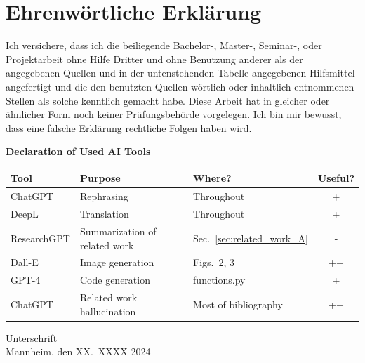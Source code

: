 \documentclass[a4paper,oneside,bibliography=totoc]{scrbook}
\begin{document}
\backmatter
\chapter{Ehrenwörtliche Erklärung}

Ich versichere, dass ich die beiliegende Bachelor-, Master-, Seminar-, oder
Projektarbeit ohne Hilfe Dritter und ohne Benutzung anderer als der angegebenen
Quellen und in der untenstehenden Tabelle angegebenen Hilfsmittel angefertigt
und die den benutzten Quellen wörtlich oder inhaltlich entnommenen Stellen als
solche kenntlich gemacht habe. Diese Arbeit hat in gleicher oder ähnlicher Form
noch keiner Prüfungsbehörde vorgelegen. Ich bin mir bewusst, dass eine falsche
Erklärung rechtliche Folgen haben wird.

\begin{center}
  \textbf{Declaration of Used AI Tools} \\[.3em]
  \begin{tabularx}{\textwidth}{lXlc}
    \toprule
    Tool & Purpose & Where? & Useful? \\
    \midrule
    ChatGPT & Rephrasing & Throughout & + \\
    DeepL & Translation & Throughout & + \\
    ResearchGPT & Summarization of related work & Sec.~\ref{sec:related_work_A} & - \\
    Dall-E & Image generation & Figs.~2, 3 & ++ \\
    GPT-4 & Code generation & functions.py & + \\
    ChatGPT & Related work hallucination & Most of bibliography & ++ \\
    \bottomrule
  \end{tabularx}
\end{center}

\vspace{2cm}
\noindent Unterschrift\\
\noindent Mannheim, den XX.~XXXX 2024 \hfill
\end{document}
